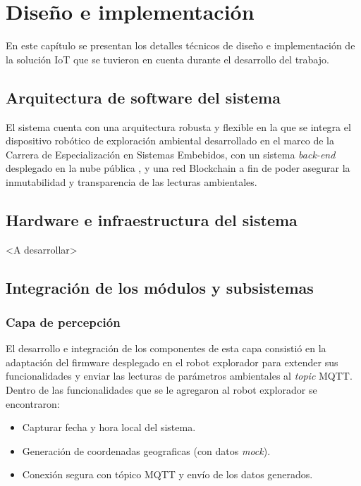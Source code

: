 \chapter{Diseño e implementación} %

\label{Chapter3} %

En este capítulo se presentan los detalles técnicos de diseño e implementación de la solución IoT que se tuvieron en cuenta durante el desarrollo del trabajo.


\section{Arquitectura de software del sistema}


El sistema cuenta con una arquitectura robusta y flexible en la que se integra el dispositivo robótico de exploración ambiental \citep{cese_gonzalo_memoria} desarrollado en el marco de la Carrera de Especialización en Sistemas Embebidos, con un sistema \textit{back-end} desplegado en la nube pública \citep{nube_publica}, y una red Blockchain \cite{blockchain} a fin de poder asegurar la inmutabilidad y transparencia de las lecturas ambientales. 


\section{Hardware e infraestructura del sistema}
 
<A desarrollar>
 
\section{Integración de los módulos y subsistemas}




\subsection{Capa de percepción}


El desarrollo e integración de los componentes de esta capa consistió en la adaptación del firmware desplegado en el robot explorador para extender sus funcionalidades y enviar las lecturas de parámetros ambientales al \textit{topic} MQTT. Dentro de las funcionalidades que se le agregaron al robot explorador se encontraron:

\begin{itemize}
	\item Capturar fecha y hora local del sistema.
	\item Generación de coordenadas geograficas (con datos \textit{mock}).
	\item Conexión segura con tópico MQTT y envío de los datos generados.	
		
\end{itemize}

